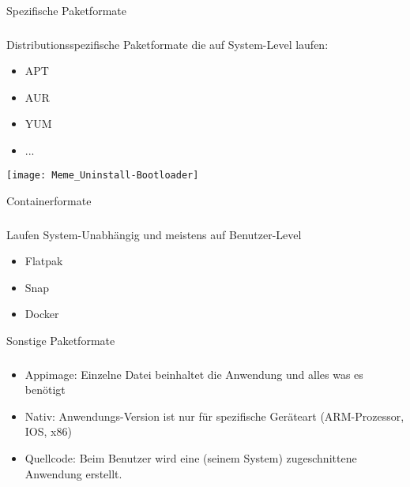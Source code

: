 \begin{frame}{Spezifische Paketformate}
    \subsubsection{}\label{subsubsec:spezifische-formate}

        Distributionsspezifische Paketformate die auf System-Level laufen:
        \begin{itemize}
            \item APT
            \item AUR
            \item YUM
            \item ...
        \end{itemize}
    \endminipage\hfill
        \texttt{[image: Meme\_Uninstall-Bootloader]}
    \endminipage\hfill
\end{frame}

\begin{frame}{Containerformate}
    \subsubsection{}\label{subsubsec:containerformate}

    Laufen System-Unabhängig und meistens auf Benutzer-Level

    \begin{itemize}
        \item Flatpak
        \item Snap
        \item Docker
    \end{itemize}

\end{frame}

\begin{frame}{Sonstige Paketformate}
    \subsubsection{}\label{subsubsec:sonstige-paketformate}

    \begin{itemize}
        \item Appimage: Einzelne Datei beinhaltet die Anwendung und alles was es benötigt
        \item Nativ: Anwendungs-Version ist nur für spezifische Geräteart (ARM-Prozessor, IOS, x86)
        \item Quellcode: Beim Benutzer wird eine (seinem System) zugeschnittene Anwendung erstellt.
    \end{itemize}

\end{frame}